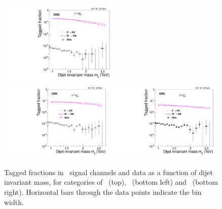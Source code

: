 \begin{figure}[!htb]
\begin{center}
\includegraphics[width=0.51\textwidth]{EXO-14-009/HqqqqZqqfigs/Signal/HwwVqq-signal-taggingEff-8TeV.pdf}
\includegraphics[width=0.49\textwidth]{EXO-14-009/HqqqqZqqfigs/Signal/HwwVqq-signal-taggingEff-LowH-8TeV.pdf}
\includegraphics[width=0.49\textwidth]{EXO-14-009/HqqqqZqqfigs/Signal/HwwVqq-signal-taggingEff-LowV-8TeV.pdf}
\end{center}
\caption{
Tagged fractions in \HwwVqq\ signal channels and data as 
a function of dijet invariant mass, for categories of 
\HWWHP\ (top), \HWWLPH\ (bottom left) and \HWWLPV\ (bottom right). 
Horizontal bars
through the data points indicate the bin width. 
}
\label{fig:HwwEffAll}
\end{figure}


\clearpage


